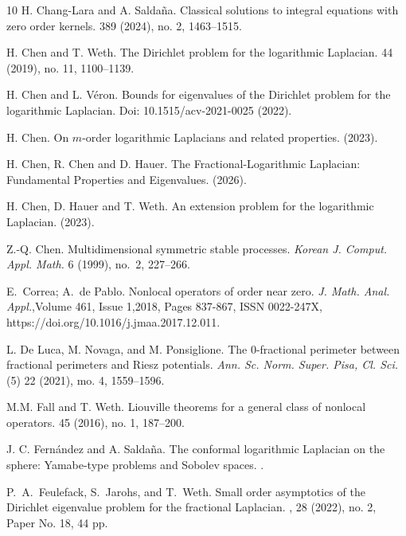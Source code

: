 \documentclass[notitlepage,11pt,reqno]{amsart}
\theoremstyle{definition}
\numberwithin{equation}{section}
\begin{document}
\begin{thebibliography}{10}
H. Chang-Lara and A. Saldaña.
\newblock Classical solutions to integral equations with zero order kernels.
 389 (2024), no. 2, 1463–1515.


H. Chen and T. Weth.
\newblock The Dirichlet problem for the logarithmic Laplacian.
 44 (2019), no. 11, 1100–1139.

H. Chen and L. V\'eron.
\newblock Bounds for eigenvalues of the Dirichlet problem for the logarithmic Laplacian.
 Doi: 10.1515/acv-2021-0025 (2022).


H. Chen.
\newblock On $m$-order logarithmic Laplacians and related properties.
 (2023).

H. Chen, R. Chen and D. Hauer.
\newblock The Fractional-Logarithmic Laplacian: Fundamental Properties and Eigenvalues.
 (2026).


H. Chen, D. Hauer and T. Weth.
\newblock An extension problem for the logarithmic Laplacian.
 (2023).

Z.-Q. Chen. 
\newblock Multidimensional symmetric stable processes.
{\em Korean J. Comput. Appl. Math.} { 6} (1999), no.~2, 227--266.

E.~Correa; A.~de Pablo.
\newblock Nonlocal operators of order near zero.
{\em J. Math. Anal. Appl.},Volume 461, Issue 1,2018, Pages 837-867, ISSN 0022-247X,
https://doi.org/10.1016/j.jmaa.2017.12.011.


L. De Luca, M. Novaga, and M. Ponsiglione.
\newblock The 0-fractional perimeter between fractional perimeters and Riesz potentials.
{\em Ann. Sc. Norm. Super. Pisa, Cl. Sci.} (5) 22 (2021), mo. 4, 1559--1596.



  M.M. Fall and T. Weth.
\newblock Liouville theorems for a general class of nonlocal operators.
 45 (2016), no. 1, 187--200. 


J. C. Fern\'andez and A. Salda\~na.
\newblock The conformal logarithmic Laplacian on the sphere: Yamabe-type problems and Sobolev spaces.
.

P.~A.~Feulefack, S.~Jarohs, and T.~Weth.
\newblock Small order asymptotics of the Dirichlet eigenvalue problem for the fractional Laplacian.
, 28 (2022), no. 2, Paper No. 18, 44 pp.


\end{thebibliography}
\end{document}
